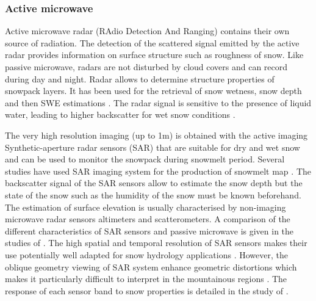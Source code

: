 \documentclass[hydrology,article,submit,moreauthors,pdftex]{Definitions/mdpi}
\begin{document}
\subsubsection{Active microwave}%




Active microwave radar (RAdio Detection And Ranging) contains their own source of radiation. The detection of the scattered signal emitted by the active radar provides information on surface structure such as roughness of snow. Like passive microwave, radars are not disturbed by cloud covers and can record during day and night. %
Radar allows to determine structure properties of snowpack layers.
It has been used for the retrieval of snow wetness, snow depth and then SWE estimations \citep{Schmid_2014}. The radar signal is sensitive to the presence of liquid water, leading to higher backscatter for wet snow conditions \citep{Magagi_2003}. 


The very high resolution imaging (up to 1m) is obtained with the active imaging Synthetic-aperture radar sensors (SAR) that are suitable for dry and wet snow and can be used to monitor the snowpack during snowmelt period. Several studies have used SAR imaging system for the production of snowmelt map  \citep{Shi_1994,Eckerstorfer_2016}. The backscatter signal of the SAR sensors allow to estimate the snow depth but the state of the snow such as the humidity of the snow must be known beforehand. The estimation of surface elevation is usually characterised by non-imaging microwave radar sensors altimeters and scatterometers. A comparison of the different characteristics of SAR sensors and passive microwave is given in the studies of \citet{Konig_2001}.
The high spatial and temporal resolution of SAR sensors makes their use potentially well adapted for snow hydrology applications \citep{Bernier_1998,Nagler_2000,Leinss_2014,Rondeau_2016}. However, the oblique geometry viewing of SAR system enhance geometric distortions which makes it particularly difficult to interpret in the mountainous regions \citep{Veyssiere_2019}. The response of each sensor band to snow properties is detailed in the study of \citet{Rango_1993}.
\end{document}
